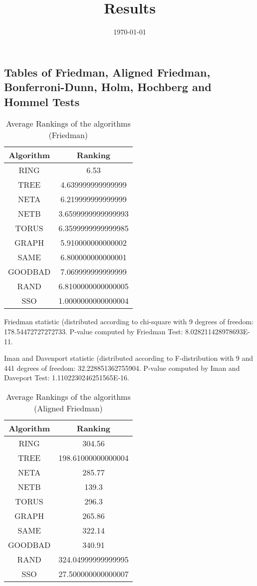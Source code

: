 \documentclass[a4paper,10pt]{article}
\title{Results}
\author{}
\date{\today}
\begin{document}
\begin{landscape}
\oddsidemargin 0in \topmargin 0in\maketitle
\section{Tables of Friedman, Aligned Friedman, Bonferroni-Dunn, Holm, Hochberg and Hommel Tests}
\begin{table}[!htp]
\centering
\caption{Average Rankings of the algorithms (Friedman)
}\begin{tabular}{c|c}
Algorithm&Ranking\\
\hline
 RING&6.53\\
 TREE&4.639999999999999\\
 NETA&6.219999999999999\\
 NETB&3.6599999999999993\\
 TORUS&6.3599999999999985\\
 GRAPH&5.910000000000002\\
 SAME&6.800000000000001\\
 GOODBAD&7.069999999999999\\
 RAND&6.8100000000000005\\
 SSO&1.0000000000000004\\
\end{tabular}
\end{table}


Friedman statistic (distributed according to chi-square with 9 degrees of freedom: 178.54472727272733. 
P-value computed by Friedman Test: 8.028211428978693E-11.\newline

Iman and Davenport statistic (distributed according to F-distribution with 9 and 441 degrees of freedom: 32.228851362755904. 
P-value computed by Iman and Daveport Test: 1.1102230246251565E-16.\newline


\newpage

\begin{table}[!htp]
\centering
\caption{Average Rankings of the algorithms (Aligned Friedman)
}\begin{tabular}{c|c}
Algorithm&Ranking\\
\hline
 RING&304.56\\
 TREE&198.61000000000004\\
 NETA&285.77\\
 NETB&139.3\\
 TORUS&296.3\\
 GRAPH&265.86\\
 SAME&322.14\\
 GOODBAD&340.91\\
 RAND&324.04999999999995\\
 SSO&27.500000000000007\\
\end{tabular}
\end{table}



\end{landscape}
\end{document}
